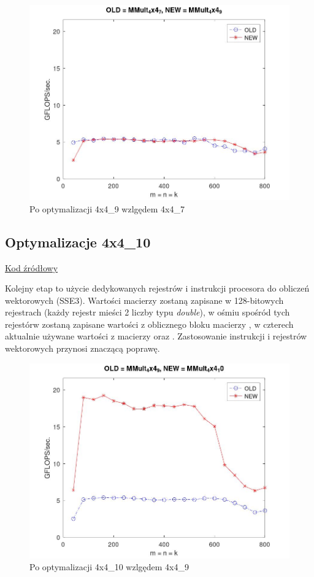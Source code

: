 \documentclass{article}
\begin{document}
\begin{figure}[H]
    \centering
    \includegraphics[width=1.0\textwidth]{figure6.jpg}
    \caption{Po optymalizacji 4x4\_9 wzlgędem 4x4\_7}
\end{figure}

\subsection{Optymalizacje 4x4\_10}

\href{https://github.com/flame/how-to-optimize-gemm/blob/master/src/MMult_4x4_10.c}{Kod źródłowy}

Kolejny etap to użycie dedykowanych rejestrów i instrukcji procesora do obliczeń wektorowych (SSE3).
Wartości macierzy zostaną zapisane w 128-bitowych rejestrach (każdy rejestr mieści 2 liczby typu
 \textit{double}), w ośmiu spośród tych rejestórw zostaną zapisane wartości z oblicznego bloku
macierzy , w czterech aktualnie używane wartości z macierzy  oraz .
Zastosowanie instrukcji i rejestrów wektorowych przynosi znaczącą poprawę.

\begin{figure}[H]
    \centering
    \includegraphics[width=1.0\textwidth]{figure7.jpg}
    \caption{Po optymalizacji 4x4\_10 wzlgędem 4x4\_9}
\end{figure}
\end{document}

